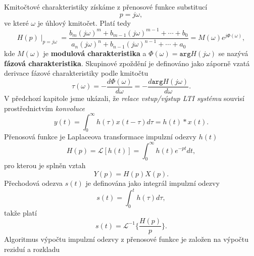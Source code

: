       Kmitočtové charakteristiky získáme z přenosové funkce substitucí
      \begin{equation}\label{SAS:eq_p_jomega}
          p = j\omega,
      \end{equation}
      ve které $\omega$ je úhlový kmitočet. Platí tedy
      \begin{equation}\label{SAS:eq_Hp_definice}
          H(p)\mid_{p = j\omega} =\frac{b_m(j\omega)^m+b_{m-1}(j\omega)^{m-1}
                                 +\cdots+b_0}{a_n(j\omega)^n+b_{n-1}(j\omega)^{n-1}+\cdots+a_0}
                                 =M(\omega)e^{j\Phi(\omega)},
      \end{equation}
      kde $M(\omega)$ je \textbf{modulová charakteristika} a $\Phi(\omega)=\texttt{arg}H(j\omega)$ se
      nazývá \textbf{fázová charakteristika}. Skupinové zpoždění je definováno jako záporně vzatá
      derivace fázové charakteristiky podle kmitočtu
      \begin{equation}\label{SAS:eq_skupinove_zpozdeni}
          \tau(\omega)=-\frac{d\Phi(\omega)}{d\omega}= - \frac{d \texttt{arg} H(j\omega)}{d\omega}.
      \end{equation}
      V předchozí kapitole jsme ukázali, že \emph{relace vstup/výstup LTI systému} souvisí
      pro\-střed\-nic\-tvím \emph{konvoluce}
      \begin{equation}\label{SAS:eq_popis_konvoluce}
          y(t)=\int_0^\infty h(\tau)x(t-\tau)d\tau = h(t)*x(t).
      \end{equation}
      Přenosová funkce je Laplaceova transformace impulzní odezvy $h(t)$
      \begin{equation}\label{SAS:eq_ht_Lap_trans_imp}
          H(p)=\mathcal{L}[h(t)]=\int_0^\infty h(t)e^{-pt}dt,
      \end{equation}
      pro kterou je splněn vztah
      \begin{equation}\label{SAS:eq_Yp}
          Y(p)=H(p)X(p).
      \end{equation}
      Přechodová odezva $s(t)$ je definována jako integrál impulzní odezvy
      \begin{equation}\label{SAS:eq_Prechod_odezva}
          s(t)=\int_0^th(\tau)d\tau,
      \end{equation}
      takže platí
      \begin{equation}\label{SAS:eq_st}
          s(t)=\mathcal{L}^{-1}\{\frac{H(p)}{p}\}.
      \end{equation}
      Algoritmus výpočtu impulzní odezvy z přenosové funkce je založen na výpočtu  reziduí a rozkladu
